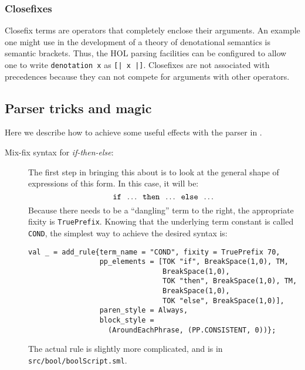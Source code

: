{\subsubsection{Closefixes}

Closefix terms are operators that completely enclose their arguments.
An example one might use in the development of a theory of
denotational semantics is semantic brackets.  Thus, the HOL parsing
facilities can be configured to allow one to write \texttt{denotation x}
as \texttt{[| x |]}.  Closefixes are not associated with precedences
because they can not compete for arguments with other operators.

\subsection{Parser tricks and magic}

Here we describe how to achieve some useful effects with the
parser in \HOL{}.

\begin{description}
\item [Mix-fix syntax for {\it if-then-else}:] The first step in
  bringing this about is to look at the general shape of expressions
  of this form.  In this case, it will be:
  \[
  \mbox{\tt if}\;\; \dots \;\;\mbox{\tt then}\;\;\dots\;\;
  \mbox{\tt else}\;\;\dots
  \]
  Because there needs to be a ``dangling'' term to the right, the
  appropriate fixity is \texttt{TruePrefix}.  Knowing that the
  underlying term constant is called \texttt{COND}, the simplest way
  to achieve the desired syntax is:
  \begin{verbatim}
val _ = add_rule{term_name = "COND", fixity = TruePrefix 70,
                 pp_elements = [TOK "if", BreakSpace(1,0), TM,
                                BreakSpace(1,0),
                                TOK "then", BreakSpace(1,0), TM,
                                BreakSpace(1,0),
                                TOK "else", BreakSpace(1,0)],
                 paren_style = Always,
                 block_style =
                   (AroundEachPhrase, (PP.CONSISTENT, 0))};
\end{verbatim}
  \noindent The actual rule is slightly more complicated, and is
  in \texttt{src/bool/boolScript.sml}.



\end{description}}
